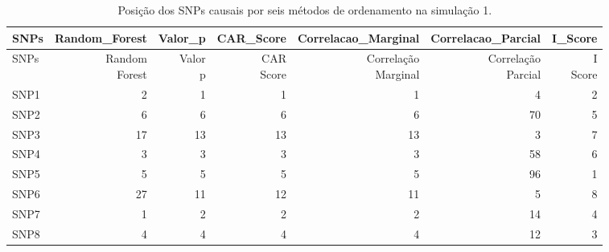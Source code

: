 \begin{table}[H]
\centering
\begin{tabular}{lrrrrrr}
  \hline
SNPs & Random\_Forest & Valor\_p & CAR\_Score & Correlacao\_Marginal & Correlacao\_Parcial & I\_Score \\ 
  \hline
 SNPs & \makecell{Random \\ Forest} & \makecell{Valor \\ p} & \makecell{CAR \\ Score} & \makecell{Correlação \\ Marginal} & \makecell{Correlação \\ Parcial} & \makecell{I \\ Score} \\ \hline
 \hline
SNP1 &   2 &   1 &   1 &   1 &   4 &   2 \\ 
  SNP2 &   6 &   6 &   6 &   6 &  70 &   5 \\ 
  SNP3 &  17 &  13 &  13 &  13 &   3 &   7 \\ 
  SNP4 &   3 &   3 &   3 &   3 &  58 &   6 \\ 
  SNP5 &   5 &   5 &   5 &   5 &  96 &   1 \\ 
  SNP6 &  27 &  11 &  12 &  11 &   5 &   8 \\ 
  SNP7 &   1 &   2 &   2 &   2 &  14 &   4 \\ 
  SNP8 &   4 &   4 &   4 &   4 &  12 &   3 \\ 
   \hline
\end{tabular}
\caption{Posição dos SNPs causais por seis métodos de ordenamento na simulação 1.} 
\label{tab:positions_causais}
\end{table}
